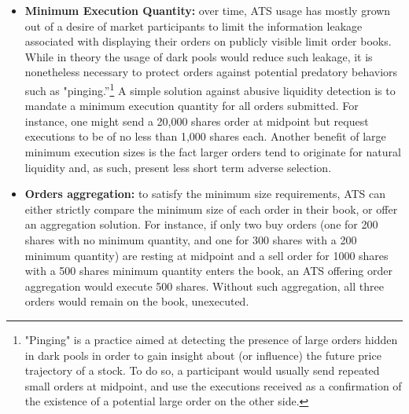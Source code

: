 \begin{itemize}
\item{\textbf{Minimum Execution Quantity:}} over time, ATS usage has mostly grown out of a desire of market participants to limit the information leakage associated with displaying their orders on publicly visible limit order books. While in theory the usage of dark pools would reduce such leakage, it is nonetheless necessary to protect orders against potential predatory behaviors such as "pinging.''\footnote{"Pinging" is a practice aimed at detecting the presence of large orders hidden in dark pools in order to gain insight about (or influence) the future price trajectory of a stock. To do so, a participant would usually send repeated small orders at midpoint, and use the executions received as a confirmation of the existence of a potential large order on the other side.} A simple solution against abusive liquidity detection is to mandate a minimum execution quantity for all orders submitted. For instance, one might send a 20,000 shares order at midpoint but request executions to be of no less than 1,000 shares each. Another benefit of large minimum execution sizes is the fact larger orders tend to originate for natural liquidity and, as such, present less short term adverse selection.  

\item{\textbf{Orders aggregation:}} to satisfy the minimum size requirements, ATS can either strictly compare the minimum size of each order in their book, or offer an aggregation solution. For instance, if only two buy orders (one for 200 shares with no minimum quantity, and one for 300 shares with a 200 minimum quantity) are resting at midpoint and a sell order for 1000 shares with a 500 shares minimum quantity enters the book, an ATS offering order aggregation would execute 500 shares. Without such aggregation, all three orders would remain on the book, unexecuted.


\end{itemize}
